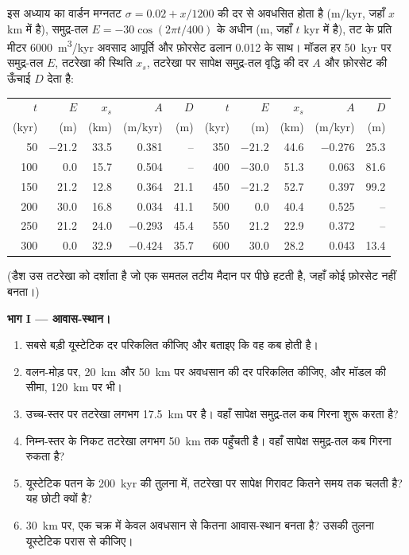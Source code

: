 \begin{problem}
\label{pb:b3:sequence-stratigraphy:1}
इस अध्याय का वार्डन मग्नतट $\sigma = 0.02 + x/1200$ की दर से अवधसित होता है
(\unit{m/kyr}, जहाँ $x$ km में है), समुद्र-तल $E = -30\cos(2\pi t/400)$ के अधीन (m,
जहाँ $t$ kyr में है), तट के प्रति मीटर \qty{6000}{m^3/kyr} अवसाद आपूर्ति और
फ़ोरसेट ढलान 0.012 के साथ। मॉडल हर \qty{50}{kyr} पर समुद्र-तल
$E$, तटरेखा की स्थिति $x_s$, तटरेखा पर सापेक्ष समुद्र-तल वृद्धि की दर $A$ और
फ़ोरसेट की ऊँचाई $D$ देता है:

\begin{center}\small
\begin{tabular}{rrrrr|rrrrr}
$t$ & $E$ & $x_s$ & $A$ & $D$ & $t$ & $E$ & $x_s$ & $A$ & $D$\\
(kyr) & (m) & (km) & (m/kyr) & (m) & (kyr) & (m) & (km) & (m/kyr) & (m)\\\hline
50 & $-21.2$ & 33.5 & 0.381 & -- & 350 & $-21.2$ & 44.6 & $-0.276$ & 25.3\\
100 & 0.0 & 15.7 & 0.504 & -- & 400 & $-30.0$ & 51.3 & 0.063 & 81.6\\
150 & 21.2 & 12.8 & 0.364 & 21.1 & 450 & $-21.2$ & 52.7 & 0.397 & 99.2\\
200 & 30.0 & 16.8 & 0.034 & 41.1 & 500 & 0.0 & 40.4 & 0.525 & --\\
250 & 21.2 & 24.0 & $-0.293$ & 45.4 & 550 & 21.2 & 22.9 & 0.372 & --\\
300 & 0.0 & 32.9 & $-0.424$ & 35.7 & 600 & 30.0 & 28.2 & 0.043 & 13.4\\
\end{tabular}
\end{center}
(डैश उस तटरेखा को दर्शाता है जो एक समतल तटीय मैदान पर पीछे हटती है, जहाँ
कोई फ़ोरसेट नहीं बनता।)

\medskip\noindent\textbf{भाग I --- आवास-स्थान।}
\begin{enumerate}
\item सबसे बड़ी यूस्टेटिक दर परिकलित कीजिए और बताइए कि वह कब होती है।
\item वलन-मोड़ पर, \qty{20}{km} और \qty{50}{km} पर अवधसान की दर परिकलित कीजिए, और
  मॉडल की सीमा, \qty{120}{km} पर भी।
\item उच्च-स्तर पर तटरेखा लगभग \qty{17.5}{km} पर है। वहाँ सापेक्ष समुद्र-तल कब
  गिरना शुरू करता है?
\item निम्न-स्तर के निकट तटरेखा लगभग \qty{50}{km} तक पहुँचती है। वहाँ सापेक्ष समुद्र-तल
  कब गिरना रुकता है?
\item यूस्टेटिक पतन के \qty{200}{kyr} की तुलना में, तटरेखा पर सापेक्ष गिरावट
  कितने समय तक चलती है? यह छोटी क्यों है?
\item \qty{30}{km} पर, एक चक्र में केवल अवधसान से कितना आवास-स्थान
  बनता है? उसकी तुलना यूस्टेटिक परास से कीजिए।
\end{enumerate}


\end{problem}

